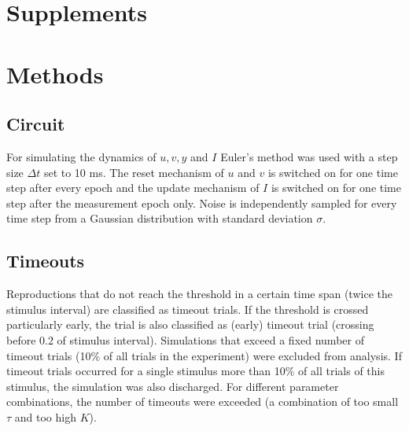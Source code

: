 \documentclass[10pt]{article}
\begin{document}


\pagebreak

\setcounter{section}{0}
\section*{Supplements}
\setcounter{figure}{0}
\setcounter{table}{0}
\setcounter{equation}{0} 
\renewcommand{\figurename}{Supplementary Figure}
\renewcommand{\tablename}{Supplementary Table}

\section{Methods}
\subsection*{Circuit}
For simulating the dynamics of $u, v, y$ and $I$ Euler's method was used with a step size $\Delta t$ set to 10 ms.
The reset mechanism of $u$ and $v$ is switched on for one time step after every epoch and the update mechanism of $I$ is switched on for one time step after the measurement epoch only.
Noise is independently sampled for every time step from a Gaussian distribution with standard deviation $\sigma$.

\subsection*{Timeouts}
Reproductions that do not reach the threshold in a certain time span (twice the stimulus interval) are classified as timeout trials. 
If the threshold is crossed particularly early, the trial is also classified as (early) timeout trial (crossing before 0.2 of stimulus interval).
Simulations that exceed a fixed number of timeout trials (10\% of all trials in the experiment) were excluded from analysis.
If timeout trials occurred for a single stimulus more than 10\% of all trials of this stimulus, the simulation was also discharged.
For different parameter combinations, the number of timeouts were exceeded (a combination of too small $\tau$ and too high $K$).
\end{document}
